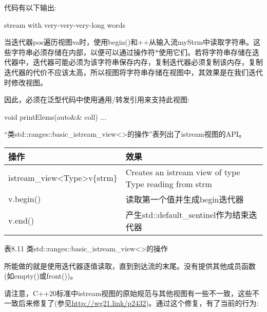 代码有以下输出:

\begin{shell}
stream
with
very-very-very-long
words
\end{shell}

当迭代器pos遍历视图va时，使用begin()和++从输入流myStrm中读取字符串。这些字符串必须存储在内部，以便可以通过操作符*使用它们。若将字符串存储在迭代器中，迭代器可能必须为该字符串保存内存，复制迭代器必须复制该内存，复制迭代器的代价不应该太高，所以视图将字符串存储在视图中，其效果是在我们迭代时修改视图。

因此，必须在泛型代码中使用通用/转发引用来支持此视图:

\begin{cpp}
void printElems(auto&& coll) {
	...
}
\end{cpp}


“类std::ranges::basic\_istream\_view<>的操作”表列出了istream视图的API。

\begin{longtable}[c]{|l|l|}
\hline
\textbf{操作} & \textbf{效果}                                     \\ \hline
\endfirsthead
%
\endhead
%
istream\_view\textless{}Type\textgreater v\{strm\} & Creates an istream view of type Type reading from strm \\ \hline
v.begin()          & 读取第一个值并生成begin迭代器 \\ \hline
v.end()            & 产生std::default\_sentinel作为结束迭代器       \\ \hline
\end{longtable}

\begin{center}
表8.11 类std::ranges::basic\_istream\_view<>的操作
\end{center}

所能做的就是使用迭代器逐值读取，直到到达流的末尾。没有提供其他成员函数(如empty()或front())。

请注意，C++20标准中istream视图的原始规范与其他视图有一些不一致，这些不一致后来修复了(参见\url{http://wg21.link/p2432})。通过这个修复，有了当前的行为:

